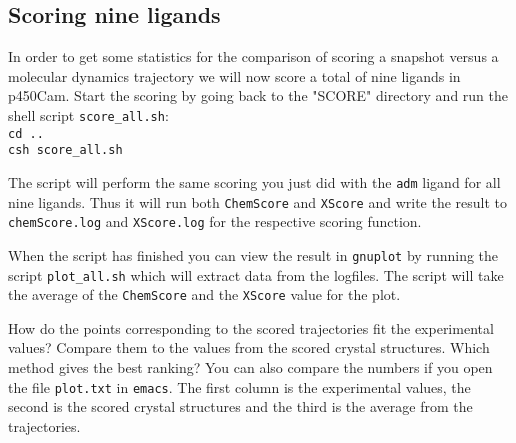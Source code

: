 \documentclass[a4paper,12pt]{article}
\newcommand{\chemscore} {\texttt{ChemScore}}
\newcommand{\xscore} {\texttt{X\-Score}}
\begin{document}
\subsection {Scoring nine ligands}

In order to get some statistics for the comparison of scoring a
snapshot versus a molecular dynamics trajectory we will now score
a total of nine ligands in p450Cam. Start the scoring by going
back to the "SCORE" directory and run the shell script
\texttt{score\_all.sh}:\\
\texttt{cd ..} \\
\texttt{csh score\_all.sh}

\noindent The script will perform the same scoring you just did
with the \texttt{adm} ligand for all nine ligands. Thus it will
run both {\chemscore} and {\xscore} and write the result to
\texttt{chemScore.log} and  \texttt{XScore.log} for the respective
scoring function.

\noindent When the script has finished you can view the result in
\texttt{gnuplot} by running the script \texttt{plot\_all.sh} which
will extract data from the logfiles. The script will take the
average of the {\chemscore} and the {\xscore} value for the plot.

\noindent How do the points corresponding to the scored
trajectories fit the experimental values? Compare them to the
values from the scored crystal structures. Which method gives the
best ranking? You can also compare the numbers if you open the
file \texttt{plot.txt} in \texttt{emacs}. The first column is the
experimental values, the second is the scored crystal structures
and the third is the average from the trajectories.




\end{document}
